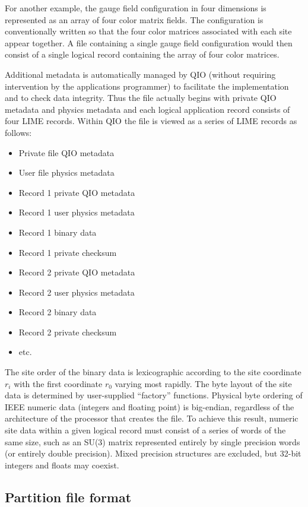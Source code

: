 \documentclass{article}
\begin{document}
For another example, the gauge field configuration in four dimensions
is represented as an array of four color matrix fields.  The
configuration is conventionally written so that the four color
matrices associated with each site appear together.  A file containing
a single gauge field configuration would then consist of a single
logical record containing the array of four color matrices.

Additional metadata is automatically managed by QIO (without requiring
intervention by the applications programmer) to facilitate the
implementation and to check data integrity.  Thus the file actually
begins with private QIO metadata and physics metadata and each logical
application record consists of four LIME records.  Within QIO the file
is viewed as a series of LIME records as follows:
%
\begin{itemize}
  \item Private file QIO metadata
  \item User file physics metadata
  \item Record 1 private QIO metadata
  \item Record 1 user physics metadata
  \item Record 1 binary data
  \item Record 1 private checksum
  \item Record 2 private QIO metadata
  \item Record 2 user physics metadata
  \item Record 2 binary data
  \item Record 2 private checksum
  \item etc.
\end{itemize}
%
The site order of the binary data is lexicographic according to the
site coordinate $r_i$ with the first coordinate $r_0$ varying most
rapidly.  The byte layout of the site data is determined by
user-supplied ``factory'' functions.  Physical byte ordering of IEEE
numeric data (integers and floating point) is big-endian, regardless
of the architecture of the processor that creates the file.  To
achieve this result, numeric site data within a given logical record
must consist of a series of words of the same size, such as an SU(3)
matrix represented entirely by single precision words (or entirely
double precision).  Mixed precision structures are excluded, but
32-bit integers and floats may coexist.

\subsection{Partition file format}
\end{document}

